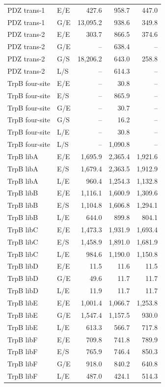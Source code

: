 \begin{longtable}[c]{llrrr}
PDZ trans-1 & E/E & 427.6 & 958.7 & 447.0 \\
PDZ trans-1 & G/E & 13,095.2 & 938.6 & 349.8 \\
PDZ trans-2 & E/E & 303.7 & 866.5 & 374.6 \\
PDZ trans-2 & G/E & -- & 638.4 & -- \\
PDZ trans-2 & G/S & 18,206.2 & 643.0 & 258.8 \\
PDZ trans-2 & L/S & -- & 614.3 & -- \\
TrpB four-site & E/E & -- & 30.8 & -- \\
TrpB four-site & E/S & -- & 865.9 & -- \\
TrpB four-site & G/E & -- & 30.7 & -- \\
TrpB four-site & G/S & -- & 16.2 & -- \\
TrpB four-site & L/E & -- & 30.8 & -- \\
TrpB four-site & L/S & -- & 1,090.8 & -- \\
TrpB libA & E/E & 1,695.9 & 2,365.4 & 1,921.6 \\
TrpB libA & E/S & 1,679.4 & 2,363.5 & 1,912.9 \\
TrpB libA & L/E & 960.4 & 1,254.3 & 1,132.8 \\
TrpB libB & E/E & 1,116.1 & 1,600.9 & 1,309.6 \\
TrpB libB & E/S & 1,104.8 & 1,606.8 & 1,294.1 \\
TrpB libB & L/E & 644.0 & 899.8 & 804.1 \\
TrpB libC & E/E & 1,473.3 & 1,931.9 & 1,693.4 \\
TrpB libC & E/S & 1,458.9 & 1,891.0 & 1,681.9 \\
TrpB libC & L/E & 984.6 & 1,190.0 & 1,150.8 \\
TrpB libD & E/E & 11.5 & 11.6 & 11.5 \\
TrpB libD & G/E & 49.6 & 11.7 & 11.7 \\
TrpB libD & L/E & 11.9 & 11.7 & 11.7 \\
TrpB libE & E/E & 1,001.4 & 1,066.7 & 1,253.8 \\
TrpB libE & G/E & 1,547.4 & 1,157.5 & 930.0 \\
TrpB libE & L/E & 613.3 & 566.7 & 717.8 \\
TrpB libF & E/E & 709.8 & 741.8 & 789.9 \\
TrpB libF & E/S & 765.9 & 746.4 & 850.3 \\
TrpB libF & G/E & 918.0 & 840.2 & 640.8 \\
TrpB libF & L/E & 487.0 & 424.1 & 514.3 \\

\end{longtable}
